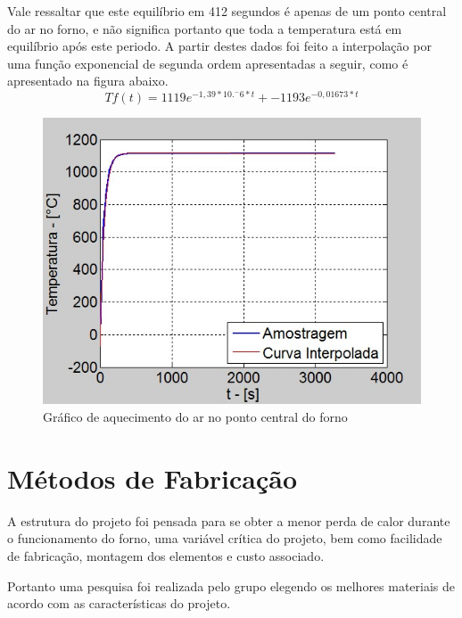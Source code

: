 Vale ressaltar que este equilíbrio em 412 segundos é apenas de um ponto central do ar no
forno, e não significa portanto que toda a temperatura está em equilíbrio após este periodo. A partir
destes dados foi feito a interpolação por uma função exponencial de segunda ordem apresentadas a
seguir, como é apresentado na figura abaixo.
\begin{equation}
Tf(t) = 1119e^{-1,39*10.^- 6*t} + -1193e^{- 0,01673*t}
\end{equation}
\begin{figure}[H]
	\centering
	\label{ansys20}
	\includegraphics[keepaspectratio=true,scale=0.5]{figuras/ansys20.jpg}
    \caption{Gráfico de aquecimento do ar no ponto central do forno}
\end{figure}

\section{Métodos de Fabricação}
A estrutura do projeto foi pensada para se obter a menor perda de calor durante o funcionamento do forno, uma variável crítica do projeto, bem como facilidade de fabricação, montagem dos elementos e custo associado.

Portanto uma pesquisa foi realizada pelo grupo elegendo os melhores materiais de acordo com as características do projeto.

